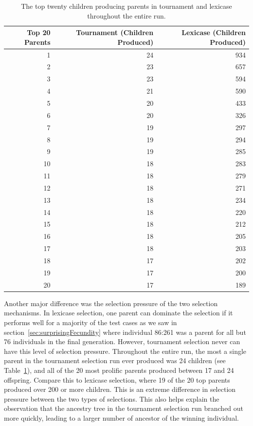 \begin{table}[t]
	\caption{The top twenty children producing parents in tournament and lexicase throughout the entire run.}
	\label{table:numChildren}
	\begin{center}
	\begin{tabular}{rrr}
		Top 20 Parents & $\quad$ Tournament (Children Produced) & $\quad$ Lexicase (Children Produced)  \\
		\hline\noalign{\smallskip}
		1 & 24 & 934 \\
		2 & 23 & 657 \\
		3 & 23 & 594 \\
		4 & 21 & 590 \\
		5 & 20 & 433 \\
		6 & 20 & 326 \\
		7 & 19 & 297 \\
		8 & 19 & 294 \\
		9 & 19 & 285 \\
		10 & 18 & 283 \\
		11 & 18 & 279 \\
		12 & 18 & 271 \\
		13 & 18 & 234 \\
		14 & 18 & 220 \\
		15 & 18 & 212 \\
		16 & 18 & 205 \\
		17 & 18 & 203 \\
		18 & 17 & 202 \\
		19 & 17 & 200 \\
		20 & 17 & 189 \\
	\end{tabular}
	\end{center}
\end{table}




Another major difference was the selection pressure of the two selection mechanisms. In lexicase 
selection, one parent can dominate the selection if it performs well for a majority of the test 
cases as we saw in section~\ref{sec:surprisingFecundity} where individual 86:261 was a parent for 
all but 76 individuals in the final generation. However, tournament selection never 
can have this level of selection pressure. Throughout the entire run,
the most a single parent in the tournament selection run ever produced was 24 children 
(see Table~\ref{table:numChildren}), and all of the 20 most prolific parents produced between 17
and 24 offspring. Compare this to lexicase selection, where 19 of the 20 top parents produced over 
200 or more children. This is an extreme difference in selection pressure between the two types of 
selections. This also helps explain the observation that the ancestry tree in the tournament selection
run branched out more quickly, leading to a larger number of ancestor of the winning individual. 

